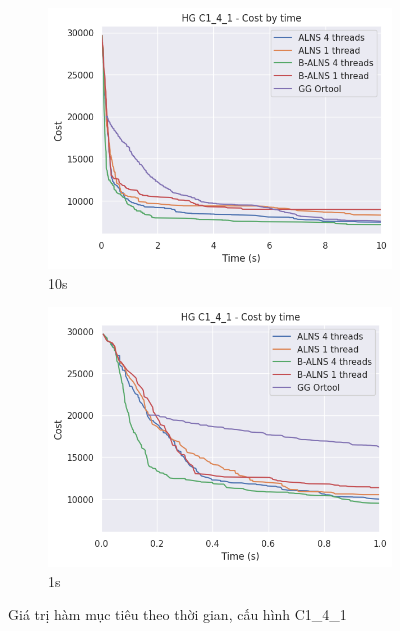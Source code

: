 \begin{figure}[H] %
  \label{fig:perf_ct_c1_4}
  \begin{subfigure}{.5\textwidth}
    \centering
    \includegraphics[width=1\linewidth]{figures/cost_time_10s_C1_4_1.png}
    \caption{10s}
    \label{fig:perf_ct_c1_4_10s}
  \end{subfigure}%
  \begin{subfigure}{.5\textwidth}
    \centering
    \includegraphics[width=1\linewidth]{figures/cost_time_1s_C1_4_1.png}
    \caption{1s}
    \label{fig:perf_ct_c1_4_1s}
  \end{subfigure}
  \caption{Giá trị hàm mục tiêu theo thời gian, cấu hình C1\_4\_1}
\end{figure}

